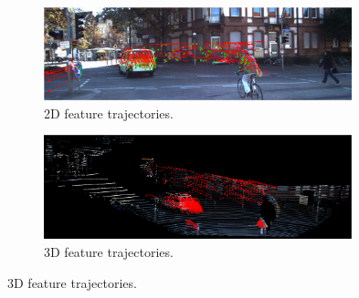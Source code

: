 \documentclass[10pt,twocolumn,letterpaper]{article}  %
\begin{document}
\begin{figure}
  \centering
	\begin{subfigure}{0.5\textwidth}
  	\centering
 	\includegraphics[height=0.108\textheight, width=0.98\textwidth]{image/traj2D.eps}%
  	\caption{2D feature trajectories.}
  	\label{fig:2dtraj}
	\end{subfigure}%
	\begin{subfigure}{0.5\textwidth}
 	\centering
  	\includegraphics[height=0.108\textheight, width=0.98\textwidth]{image/traj3D.eps}%
  	\caption{3D feature trajectories.}
  	\label{fig:3dtraj} 
  	\end{subfigure}%
  	

\end{figure}
\end{document}

